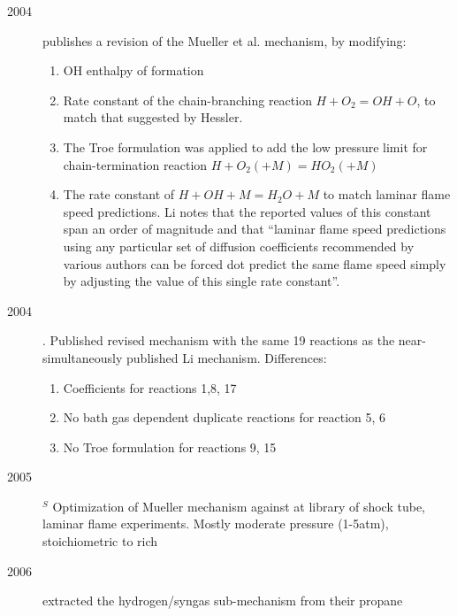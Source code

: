 \documentclass[preprint,3p,times,twocolumn]{elsarticle}
\begin{document}
\begin{description}
            \item[2004] \citet{LiZKD04} publishes a revision of the Mueller et al. mechanism, by modifying:
                \begin{enumerate}
                    \item OH enthalpy of formation
                    \item Rate constant of the chain-branching reaction $H+O_2 = OH + O$, to match that suggested by Hessler.
                    \item The Troe formulation was applied to add the low
                        pressure limit for chain-termination reaction $H + O_2 (+M)
                        = HO_2 (+M)$ 
                    \item The rate constant of $H + OH + M = H_2O + M$
                        to match laminar flame speed predictions. Li notes that the
                        reported values of this constant span an order of magnitude
                        and that ``laminar flame speed predictions using any
                        particular set of diffusion coefficients recommended by
                        various authors can be forced dot predict the same flame
                        speed simply by adjusting the value of this single rate
                        constant''.
                \end{enumerate}
                \item[2004] \citet{ConaireCSPW04}. Published revised
                  mechanism with the same 19 reactions as the
                  near-simultaneously published Li mechanism. Differences:
                  \begin{enumerate}
                  \item Coefficients for reactions 1,8, 17
                    \item No bath gas dependent duplicate reactions
                      for reaction 5, 6
                      \item No Troe formulation for reactions 9, 15
                  \end{enumerate}
            \item[2005]$^S$ \citet{DavisJWE05} Optimization of Mueller
                mechanism against at library of shock tube, laminar flame
                experiments. Mostly moderate pressure (1-5atm), stoichiometric
                to rich
            \item[2006] \citet{SaxenaW06} extracted the
              hydrogen/syngas sub-mechanism from their propane

\end{description}
\end{document}
